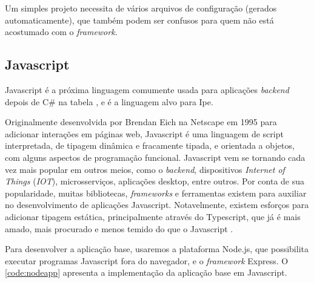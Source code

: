 Um simples projeto necessita de vários arquivos de configuração (gerados automaticamente),
que também podem ser confusos para quem não está acostumado com o \textit{framework}.


\subsection{Javascript}\label{subsec:js}

Javascript é a próxima linguagem comumente usada para aplicações \textit{backend}
depois de C\# na tabela \textcite{tiobeindex}, e é a linguagem alvo para Ipe.

Originalmente desenvolvida por Brendan Eich na Netscape em 1995 para adicionar
interações em páginas web, Javascript é uma linguagem de script interpretada, de
tipagem dinâmica e fracamente tipada, e orientada a objetos, com alguns aspectos
de programação funcional. Javascript vem se tornando cada vez mais popular em
outros meios, como o \textit{backend}, dispositivos \textit{Internet of Things}
(\textit{IOT}), microsserviços, aplicações desktop, entre outros. Por conta de
sua popularidade, muitas bibliotecas, \textit{frameworks} e ferramentas existem
para auxiliar no desenvolvimento de aplicações Javascript.  Notavelmente, existem
esforços para adicionar tipagem estática, principalmente através do Typescript,
que já é mais amado, mais procurado e menos temido do que o Javascript
\textcite{stackoverflowsurvey}.

Para desenvolver a aplicação base, usaremos a plataforma Node.js, que possibilita
executar programas Javascript fora do navegador, e o \textit{framework} Express.
O \autoref{code:nodeapp} apresenta a implementação da aplicação base em Javascript.


